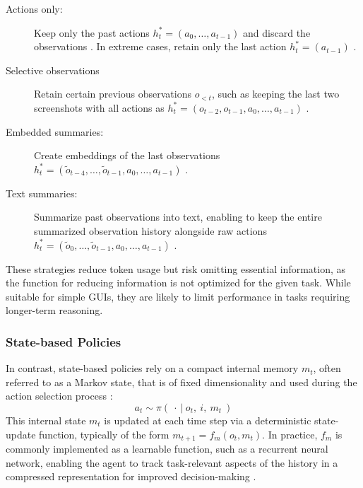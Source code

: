 \begin{description}
    \item[Actions only:] Keep only the past actions $h_t^*=\left(a_0,\hdots,a_{t-1}\right)$ and discard the observations . In extreme cases, retain only the last action $h_t^*=\left(a_{t-1}\right)$ .
    \item[Selective observations] Retain certain previous observations $o_{<t}$, such as keeping the last two screenshots with all actions as $h_t^*=\left(o_{t-2},o_{t-1},a_0,\hdots,a_{t-1}\right)$ \citep{furuta_multimodal_2024}.
    \item[Embedded summaries:] Create embeddings of the last observations $h_t^*=\left(\tilde{o}_{t-4},\hdots,\tilde{o}_{t-1},a_0,\hdots,a_{t-1}\right)$ \citep{lu_gui_2024}.
    \item[Text summaries:] Summarize past observations into text, enabling to keep the entire summarized observation history alongside raw actions $h_t^*=\left(\tilde{o}_{0},\hdots,\tilde{o}_{t-1},a_0,\hdots, a_{t-1}\right)$ \citep{zheng_synapse_2024}.
\end{description}

These strategies reduce token usage but risk omitting essential information, as the function for reducing information is not optimized for the given task. While suitable for simple GUIs, they are likely to limit performance in tasks requiring longer-term reasoning.

\subsubsection{State-based Policies}\label{sec:agent_policy_state}
In contrast, state-based policies rely on a compact internal memory $m_t$, often referred to as a Markov state, that is of fixed dimensionality and used during the action selection process :
%
\begin{equation}
a_t \sim \pi(\ \cdot\ |\ o_t,\ i,\ m_t\ ) \label{eq:state-based-policy}
\end{equation}
%
This internal state $m_t$ is updated at each time step via a deterministic state-update function, typically of the form $m_{t+1}=f_m(o_{t},m_{t})$.
In practice, $f_m$ is commonly implemented as a learnable function, such as a recurrent neural network, enabling the agent to track task-relevant aspects of the history in a compressed representation for improved decision-making .

